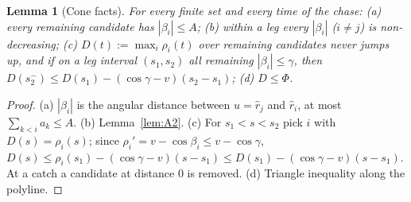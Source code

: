 \documentclass[11pt]{article}
\newtheorem{lemma}{Lemma}
\theoremstyle{remark}\newtheorem{remark}{Remark}
\newcommand{\rhat}{\hat r}
\begin{document}
\begin{lemma}[Cone facts]\label{lem:A21}
For every finite set and every time of the chase: (a) every remaining candidate has $|\beta_i|\le A$; (b) within a leg every
$|\beta_i|$ ($i\neq j$) is non-decreasing; (c) $D(t):=\max_i\rho_i(t)$ over remaining candidates never jumps up, and if on a leg
interval $(s_1,s_2)$ all remaining $|\beta_i|\le\gamma$, then $D(s_2^-)\le D(s_1)-(\cos\gamma-v)(s_2-s_1)$; (d) $D\le\Phi$.
\end{lemma}
\begin{proof}
(a) $|\beta_i|$ is the angular distance between $u=\rhat_j$ and $\rhat_i$, at most $\sum_{k<i}a_k\le A$. (b) Lemma~\ref{lem:A2}.
(c) For $s_1<s<s_2$ pick $i$ with $D(s)=\rho_i(s)$; since $\rho_i'=v-\cos\beta_i\le v-\cos\gamma$,
$D(s)\le\rho_i(s_1)-(\cos\gamma-v)(s-s_1)\le D(s_1)-(\cos\gamma-v)(s-s_1)$. At a catch a candidate at distance $0$ is removed.
(d) Triangle inequality along the polyline.
\end{proof}
\end{document}
